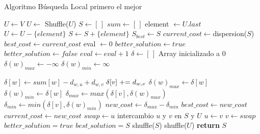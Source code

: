 \begin{algorithm}[H]
\caption{Algoritmo Búsqueda Local primero el mejor}
\begin{algorithmic}[1]
\State $U \gets V$
\State $U \gets$ Shuffle($U$)
\State $S \gets [ \, ]$
\State $sum \gets [ \, ]$
\State
{}
    \State element $\gets U.last$
    \State $U \gets U - \{element\}$
    \State $S \gets S + \{element\}$
\EndFor
\State
\State $S_{best} \gets S$
\State $current\_cost \gets $dispersion($S$)
\State $best\_cost \gets current\_cost$
\State
\State eval $\gets 0$
\State $better\_solution \gets true$
\State
{}
    \State $better\_solution \gets false$
    \State
            \State $eval \gets eval+1$
            \State $\delta \gets [\,]$ \Comment Array inicializado a 0
            \State $\delta(w)_{max} \gets -\infty$
            \State $\delta(w)_{min} \gets \infty$
            \State
{}
\end{algorithmic}
\end{algorithm}

\begin{algorithm}[H]
\begin{algorithmic}
                    \State $\delta[w] \gets sum[w] - d_{w,u} + d_{w,v}$
                    \State $\delta[v] \mathrel{+}= d_{w,v}$
                    \State
                        \State $\delta(w)_{max} \gets \delta[w]$
                    \EndIf
                        \State $\delta(w)_{min} \gets \delta[w]$
                    \EndIf
                \EndIf
            \EndFor
            \State
            \State $\delta_{max} \gets max(\delta[v], \delta(w)_{max})$
            \State $\delta_{min} \gets min(\delta[v], \delta(w)_{min})$
            \State $new\_cost \gets \delta_{max} - \delta_{min}$
                \State $best\_cost \gets new\_cost$
                \State $current\_cost \gets new\_cost$
                \State
                \State $swap \gets u$ \Comment intercambio $u$ y $v$ en $S$ y $U$
                \State $u \gets v$
                \State $v \gets swap$
                \State $better\_solution = true$
                \State $best\_solution = S$
            \EndIf
            \State
        \EndFor
    \EndFor
    \State
    \State shuffle($S$)
    \State shuffle($U$)
\EndWhile
\State
\State \textbf{return} $S$  
\end{algorithmic}
\end{algorithm}




